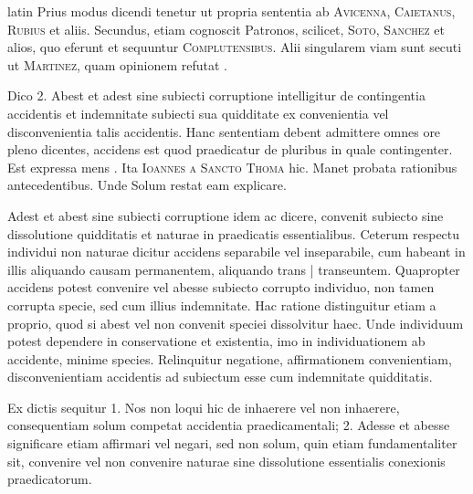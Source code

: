 \begin{otherlanguage*}{latin}
\pstart
Prius modus dicendi tenetur ut propria sententia ab \textsc{Avicenna}, \textsc{Caietanus}, \textsc{Rubius} et aliis. Secundus, etiam cognoscit Patronos, scilicet, \textsc{Soto}, \textsc{Sanchez} et alios, quo eferunt et sequuntur \textsc{Complutensibus}\index[persons]{}. Alii singularem viam sunt secuti ut \textsc{Martinez}, quam opinionem refutat . 
\pend

\pstart
Dico 2. Abest et adest sine subiecti corruptione intelligitur de contingentia accidentis et indemnitate subiecti sua quidditate ex convenientia vel disconvenientia talis accidentis. Hanc sententiam debent admittere omnes ore pleno dicentes, accidens est quod praedicatur de pluribus in quale contingenter. Est expressa mens . Ita \textsc{Ioannes a Sancto Thoma} hic. Manet probata rationibus antecedentibus. Unde Solum restat eam explicare. 
\pend

\pstart
Adest et abest sine subiecti corruptione idem ac dicere, convenit subiecto sine dissolutione quidditatis et naturae in praedicatis essentialibus. Ceterum respectu individui non naturae dicitur accidens separabile vel inseparabile, cum habeant in illis aliquando causam permanentem, aliquando trans \textnormal{|} transeuntem. Quapropter accidens potest convenire vel abesse subiecto corrupto individuo, non tamen corrupta specie, sed cum illius indemnitate. Hac ratione distinguitur etiam a proprio, quod si abest vel non convenit speciei dissolvitur haec. Unde individuum potest dependere in conservatione et existentia, imo in individuationem ab accidente, minime species. Relinquitur negatione, affirmationem convenientiam, disconvenientiam accidentis ad subiectum esse cum indemnitate quidditatis. 
\pend

\pstart
Ex dictis sequitur 1. Nos non loqui hic de inhaerere vel non inhaerere, consequentiam solum competat accidentia praedicamentali; 2. Adesse et abesse significare etiam affirmari vel negari, sed non solum, quin etiam fundamentaliter sit, convenire vel non convenire naturae sine dissolutione essentialis conexionis praedicatorum. 
\pend


\end{otherlanguage*}
